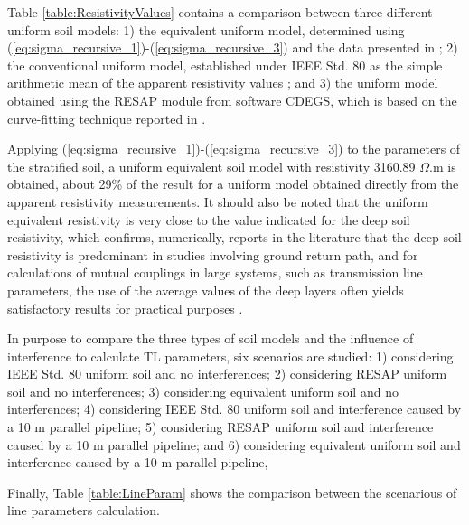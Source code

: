 \documentclass[conference]{IEEEtran}
\begin{document}
Table \ref{table:ResistivityValues} contains a comparison between three different uniform soil models: 1) the equivalent uniform model, determined using (\ref{eq:sigma_recursive_1})-(\ref{eq:sigma_recursive_3}) and the data presented in \cite{NBR7117}; 2) the conventional uniform model, established under IEEE Std. 80 as the simple arithmetic mean of the apparent resistivity values \cite{IEEEStd80}; and 3) the uniform model obtained using the RESAP module from software CDEGS, which is based on the curve-fitting technique reported in \cite{Dawalibi1984a}.

Applying (\ref{eq:sigma_recursive_1})-(\ref{eq:sigma_recursive_3}) to the parameters of the stratified soil, a uniform equivalent soil model with resistivity 3160.89 $\Omega$.m is obtained, about 29\% of the result for a uniform model obtained directly from the apparent resistivity measurements. It should also be noted that the uniform equivalent resistivity is very close to the value indicated for the deep soil resistivity, which confirms, numerically, reports in the literature that the deep soil resistivity is predominant in studies involving ground return path, and for calculations of mutual couplings in large systems, such as transmission line parameters, the use of the average values of the deep layers often yields satisfactory results for practical purposes \cite{Southey2005}.

In purpose to compare the three types of soil models and the influence of interference to calculate TL parameters, six scenarios are studied: 1) considering IEEE Std. 80 uniform soil and no interferences; 2) considering RESAP uniform soil and no interferences; 3) considering equivalent uniform soil and no interferences; 4) considering IEEE Std. 80 uniform soil and interference caused by a 10 m parallel pipeline; 5) considering RESAP uniform soil and interference caused by a 10 m parallel pipeline; and 6) considering equivalent uniform soil and interference caused by a 10 m parallel pipeline,

Finally, Table \ref{table:LineParam} shows the comparison between the scenarious of line parameters calculation.
\end{document}
